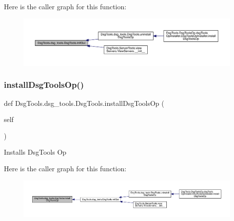 Here is the caller graph for this function\+:
\nopagebreak
\begin{figure}[H]
\begin{center}
\leavevmode
\includegraphics[width=350pt]{class_dsg_tools_1_1dsg__tools_1_1_dsg_tools_ad85466220ae044da1b255a54b0943b59_icgraph}
\end{center}
\end{figure}
\mbox{\label{class_dsg_tools_1_1dsg__tools_1_1_dsg_tools_a53ac2afe989a426adbc3a2e488e5ddb5}} 
\subsubsection{\texorpdfstring{install\+Dsg\+Tools\+Op()}{installDsgToolsOp()}}
{\footnotesize\ttfamily def Dsg\+Tools.\+dsg\+\_\+tools.\+Dsg\+Tools.\+install\+Dsg\+Tools\+Op (\begin{DoxyParamCaption}\item[{}]{self }\end{DoxyParamCaption})}

\begin{DoxyVerb}Installs DsgTools Op
\end{DoxyVerb}
 Here is the caller graph for this function\+:
\nopagebreak
\begin{figure}[H]
\begin{center}
\leavevmode
\includegraphics[width=350pt]{class_dsg_tools_1_1dsg__tools_1_1_dsg_tools_a53ac2afe989a426adbc3a2e488e5ddb5_icgraph}
\end{center}
\end{figure}
\mbox{\label{class_dsg_tools_1_1dsg__tools_1_1_dsg_tools_a3487d8769e5ad8651de6d83104332d52}} 
